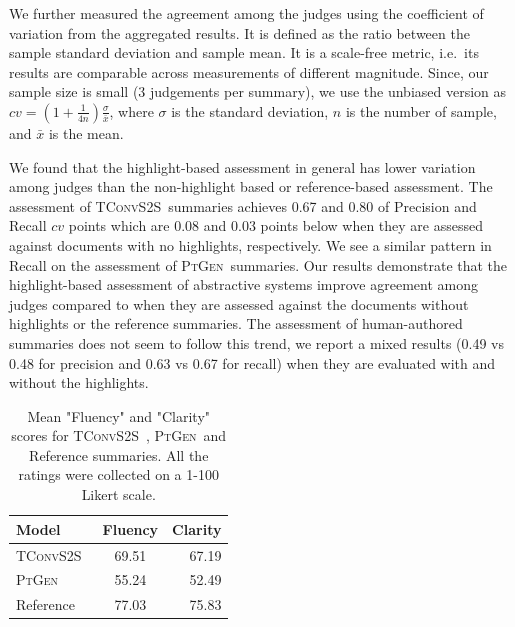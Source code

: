 \documentclass[11pt,a4paper]{article}
\newcommand\ptgen{\textsc{PtGen}}
\newcommand\tconv{\textsc{TConvS2S}}
\begin{document}

We further measured the agreement among the judges using the coefficient of variation \citep{everitt2006cambridge} from the aggregated results. It is defined as the ratio between the sample standard deviation and sample mean. It is a scale-free metric, i.e.\ its results are comparable across measurements of different magnitude.
Since, our sample size is  small (3 judgements per summary), we  use the unbiased version \citep{sokal1995biometry} as $cv = (1 + \frac{1}{4n})\frac{\sigma}{\bar{x}}$, where $\sigma$ is the standard deviation, $n$ is the number of sample, and $\bar{x}$ is the mean.

We found that the highlight-based assessment in general has lower variation among judges than the non-highlight based or reference-based assessment. The assessment of \tconv\ summaries achieves 0.67 and 0.80 of Precision and Recall $cv$ points which are 0.08 and 0.03 points below when they are assessed against documents with no highlights, respectively. We see a similar pattern in Recall on the assessment of \ptgen\ summaries. Our results demonstrate that the highlight-based assessment of abstractive systems improve agreement among judges compared to when they are assessed against the documents without highlights or the reference summaries. The assessment of human-authored summaries does not seem to follow this trend, we report a mixed results (0.49 vs 0.48 for precision and 0.63 vs 0.67 for recall) when they are evaluated with and without the highlights.



\begin{table}[t!]
\small
\centering
\begin{tabular}{l | cr}
\hline
\textbf{Model} & \textbf{Fluency} & \textbf{Clarity} \\
\hline
\tconv\  & 69.51        & 67.19        \\
\ptgen\      & 55.24        & 52.49        \\
Reference      & 77.03        & 75.83       \\
\hline
\end{tabular}
\caption{Mean "Fluency" and "Clarity" scores for \tconv\ , \ptgen\   and Reference summaries. All the ratings were collected on a 1-100 Likert scale.}
\label{table:fluencyclarityresult}
\end{table}
\end{document}
